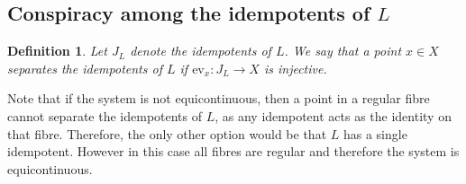 \documentclass[10pt,a4paper]{amsart}
\newtheorem{definition}[theorem]{Definition}
\numberwithin{equation}{section}
\newcommand{\ev}{\mathrm{ev}}
\begin{document}
\subsection{Conspiracy among the idempotents of $L$}

\begin{definition}
Let $J_L$ denote the idempotents of $L$.  We say that a point $x\in X$ {\em separates the idempotents} of $L$ if $\ev_x:J_L\to X$ is injective.
\end{definition}
Note that if the system is not equicontinuous, then a 
point in a regular fibre cannot separate the idempotents of $L$, as  any idempotent acts as the identity on that fibre. Therefore, 
the only other option would be that $L$ has a single idempotent. However in this case all fibres are regular and therefore the system is equicontinuous. 
 
\end{document}
